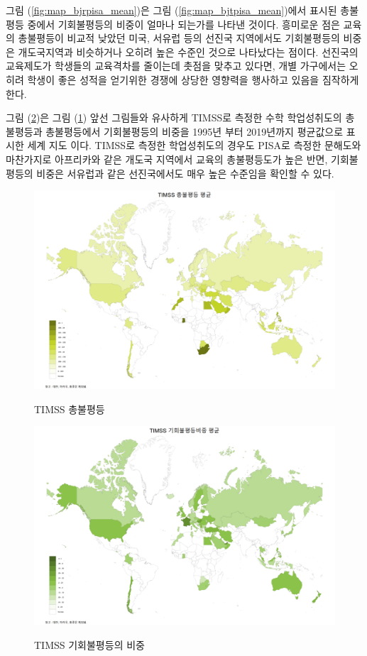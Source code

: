 그림 (\ref{fig:map_bjrpisa_mean})은 그림 (\ref{fig:map_bjtpisa_mean})에서 표시된 총불평등 중에서 기회불평등의 비중이 얼마나 되는가를 나타낸 것이다.
흥미로운 점은 교육의 총불평등이 비교적 낮았던 미국, 서유럽 등의 선진국 지역에서도 기회불평등의 비중은 개도국지역과 비슷하거나 오히려 높은 수준인 것으로 나타났다는 점이다.
선진국의 교육제도가 학생들의 교육격차를 줄이는데 촛점을 맞추고 있다면, 개별 가구에서는 오히려 학생이 좋은 성적을 얻기위한 경쟁에 상당한 영향력을 행사하고 있음을 짐작하게 한다.


그림 (\ref{fig:map_bjrtimss_mean})은 그림 (\ref{fig:map_bjttimss_mean}) 앞선 그림들와 유사하게 TIMSS로 측정한 수학 학업성취도의 총불평등과 총불평등에서 기회불평등의 비중을 1995년 부터 2019년까지 평균값으로 표시한 세계 지도 이다.
TIMSS로 측정한 학업성취도의 경우도 PISA로 측정한 문해도와 마찬가지로 아프리카와 같은 개도국 지역에서 교육의 총불평등도가 높은 반면, 기회불평등의 비중은 서유럽과 같은 선진국에서도 매우 높은 수준임을 확인할 수 있다.

\begin{figure}[htpb]
    \centering
    \caption{TIMSS 총불평등}
    \includegraphics[width=\textwidth]{figure/map_bjttimss_mean.png}
    \label{fig:map_bjttimss_mean}
\end{figure}

\begin{figure}[htpb]
    \centering
    \caption{TIMSS 기회불평등의 비중}
    \includegraphics[width=\textwidth]{figure/map_bjrtimss_mean.png}
    \label{fig:map_bjrtimss_mean}
\end{figure}
    
